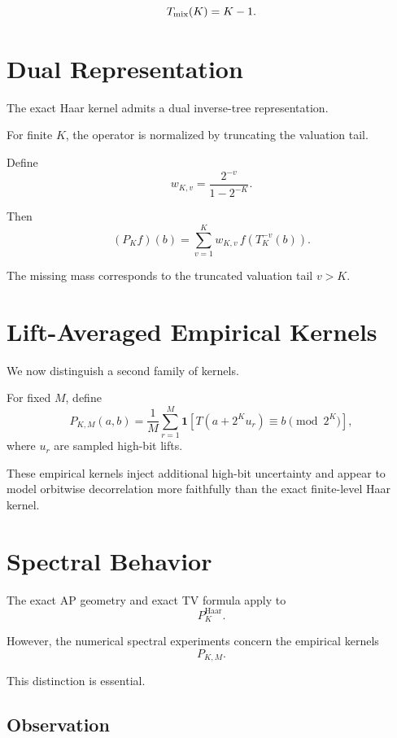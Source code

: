 \documentclass[11pt]{article}
\begin{document}
\begin{corollary}
\[
T_{\rm mix}(K)=K-1.
\]
\end{corollary}

\section{Dual Representation}

The exact Haar kernel admits a dual inverse-tree representation.

For finite \(K\),
the operator is normalized by truncating the valuation tail.

Define
\[
w_{K,v}
=
\frac{2^{-v}}{1-2^{-K}}.
\]

Then
\[
(P_Kf)(b)
=
\sum_{v=1}^{K} w_{K,v}\,
f(T^{-v}_K(b)).
\]

The missing mass corresponds to the truncated valuation tail \(v>K\).

\section{Lift-Averaged Empirical Kernels}

We now distinguish a second family of kernels.

\begin{definition}
For fixed \(M\),
define
\[
P_{K,M}(a,b)
=
\frac1M
\sum_{r=1}^{M}
\mathbf 1
\left[
T(a+2^K u_r)\equiv b \pmod{2^K}
\right],
\]
where \(u_r\) are sampled high-bit lifts.
\end{definition}

These empirical kernels inject additional high-bit uncertainty and appear to model orbitwise decorrelation more faithfully than the exact finite-level Haar kernel.

\section{Spectral Behavior}

The exact AP geometry and exact TV formula apply to
\[
P_K^{\mathrm{Haar}}.
\]

However, the numerical spectral experiments concern the empirical kernels
\[
P_{K,M}.
\]

This distinction is essential.

\subsection*{Observation}
\end{document}
